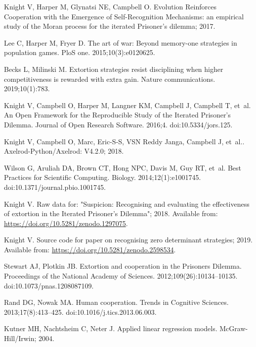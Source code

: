 \documentclass[10pt,letterpaper]{article}
\begin{document}
\begin{thebibliography}{10}
Knight V, Harper M, Glynatsi NE, Campbell O.
\newblock Evolution Reinforces Cooperation with the Emergence of
  Self-Recognition Mechanisms: an empirical study of the Moran process for the
  iterated Prisoner's dilemma; 2017.

Lee C, Harper M, Fryer D.
\newblock The art of war: Beyond memory-one strategies in population games.
\newblock PloS one. 2015;10(3):e0120625.

Becks L, Milinski M.
\newblock Extortion strategies resist disciplining when higher competitiveness
  is rewarded with extra gain.
\newblock Nature communications. 2019;10(1):783.

Knight V, Campbell O, Harper M, Langner KM, Campbell J, Campbell T, et~al.
\newblock An Open Framework for the Reproducible Study of the Iterated
  Prisoner's Dilemma.
\newblock Journal of Open Research Software. 2016;4.
\newblock doi:{10.5334/jors.125}.

Knight V, Campbell O, Marc, {Eric-S-S}, {VSN Reddy Janga}, Campbell J, et~al..
  Axelrod-Python/Axelrod: V4.2.0; 2018.

Wilson G, Aruliah DA, Brown CT, Hong NPC, Davis M, Guy RT, et~al.
\newblock Best Practices for Scientific Computing.
 Biology. 2014;12(1):e1001745.
\newblock doi:{10.1371/journal.pbio.1001745}.

Knight V. {Raw data for: "Suspicion: Recognising and evaluating the
  effectiveness of extortion in the Iterated Prisoner's Dilemma"}; 2018.
\newblock Available from: \url{https://doi.org/10.5281/zenodo.1297075}.

Knight V. {Source code for paper on recognising zero determinant strategies};
  2019.
\newblock Available from: \url{https://doi.org/10.5281/zenodo.2598534}.

Stewart AJ, Plotkin JB.
\newblock Extortion and cooperation in the Prisoner{\textquotesingle}s Dilemma.
\newblock Proceedings of the National Academy of Sciences.
  2012;109(26):10134--10135.
\newblock doi:{10.1073/pnas.1208087109}.

Rand DG, Nowak MA.
\newblock Human cooperation.
\newblock Trends in Cognitive Sciences. 2013;17(8):413--425.
\newblock doi:{10.1016/j.tics.2013.06.003}.

Kutner MH, Nachtsheim C, Neter J.
\newblock Applied linear regression models.
\newblock McGraw-Hill/Irwin; 2004.


\end{thebibliography}
\end{document}
